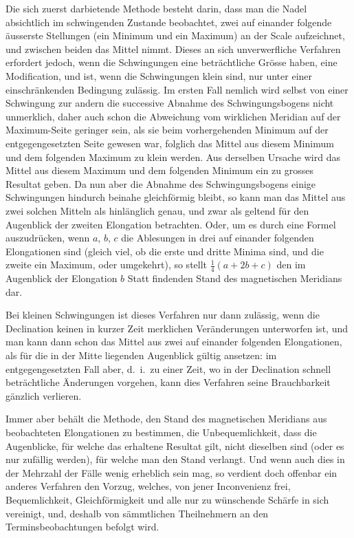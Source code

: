 \documentclass[12pt,a4paper]{article}
\begin{document}
Die sich zuerst darbietende Methode besteht darin, dass man die Nadel absichtlich im schwingenden Zustande beobachtet, zwei auf einander folgende \"ausserste Stellungen (ein Minimum und ein Maximum) an der Scale aufzeichnet, und zwischen beiden das Mittel nimmt. Dieses an sich unverwerfliche Verfahren erfordert jedoch, wenn die Schwingungen eine betr\"achtliche Gr\"osse haben, eine Modification, und ist, wenn die Schwingungen klein sind, nur unter einer einschr\"ankenden Bedingung zul\"assig. Im ersten Fall nemlich wird selbst von einer Schwingung zur andern die successive Abnahme des Schwingungsbogens nicht unmerklich, daher auch schon die Abweichung vom wirklichen Meridian auf der Maximum-Seite geringer sein, als sie beim vorhergehenden Minimum auf der entgegengesetzten Seite gewesen war, folglich das Mittel aus diesem Minimum und dem folgenden Maximum zu klein werden. Aus derselben Ursache wird das Mittel aus diesem Maximum und dem folgenden Minimum ein zu grosses Resultat geben. Da nun aber die Abnahme des Schwingungsbogens einige Schwingungen hindurch beinahe gleichf\"ormig bleibt, so kann man das Mittel aus zwei solchen Mitteln als hinl\"anglich genau, und zwar als geltend f\"ur den Augenblick der zweiten Elongation betrachten. Oder, um es durch eine Formel auszudr\"ucken, wenn $a$, $b$, $c$ die Ablesungen in drei auf einander folgenden Elongationen sind (gleich viel, ob die erste und dritte Minima sind, und die zweite ein Maximum, oder umgekehrt), so stellt $\tfrac{1}{4}(a+2b+c)$ den im Augenblick der Elongation $b$ Statt findenden Stand des magnetischen Meridians dar.

Bei kleinen Schwingungen ist dieses Verfahren nur dann zul\"assig, wenn die Declination keinen in kurzer Zeit merklichen Ver\"anderungen unterworfen ist, und man kann dann schon das Mittel aus zwei auf einander folgenden Elongationen, als f\"ur die in der Mitte liegenden Augenblick g\"ultig ansetzen: im entgegengesetzten Fall aber, d.~i.\ zu einer Zeit, wo in der Declination schnell betr\"achtliche \"Anderungen vorgehen, kann dies Verfahren seine Brauchbarkeit g\"anzlich verlieren.

Immer aber beh\"alt die Methode, den Stand des magnetischen Meridians aus beobachteten Elongationen zu bestimmen, die Unbequemlichkeit, dass die Augenblicke, f\"ur welche das erhaltene Resultat gilt, nicht dieselben sind (oder es nur zuf\"allig werden), f\"ur welche man den Stand verlangt. Und wenn auch dies in der Mehrzahl der F\"alle wenig erheblich sein mag, so verdient doch offenbar ein anderes Verfahren den Vorzug, welches, von jener Inconvenienz frei, Bequemlichkeit, Gleichf\"ormigkeit und alle nur zu w\"unschende Sch\"arfe in sich vereinigt, und, deshalb von s\"ammtlichen Theilnehmern an den Terminsbeobachtungen befolgt wird.
\end{document}
